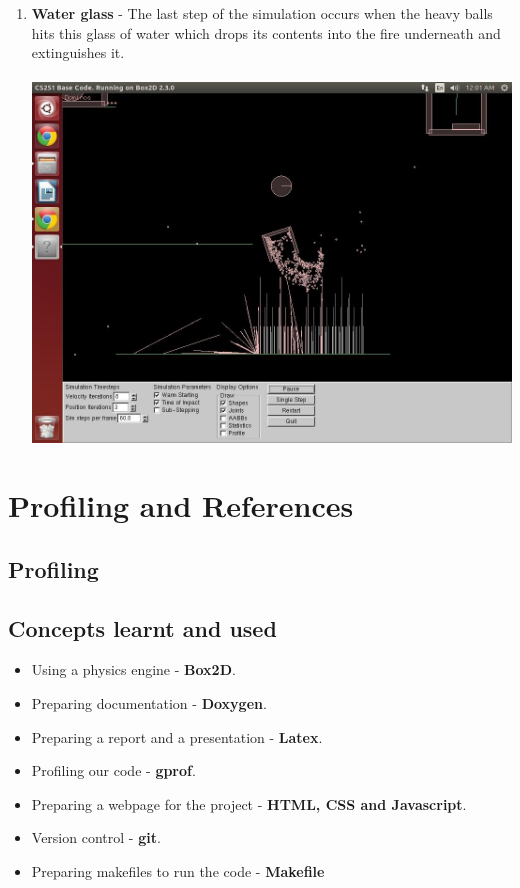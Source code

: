 \documentclass{report}
\begin{document}
\begin{enumerate}
\item \textbf{Water glass} - The last step of the simulation occurs when the heavy balls hits this glass of water which drops its contents into the fire underneath and extinguishes it.\\\\
\includegraphics[scale=0.25]{pics/WaterGlassAndFire(extinguished)}

\end{enumerate}
\pagebreak

\chapter{Profiling and References}
\section{Profiling}


\section{Concepts learnt and used}
\begin{itemize}
\item Using a physics engine - \textbf{Box2D}.
\item Preparing documentation - \textbf{Doxygen}.
\item Preparing a report and a presentation - \textbf{Latex}.
\item Profiling our code - \textbf{gprof}.
\item Preparing a webpage for the project - \textbf{HTML, CSS and Javascript}.
\item Version control - \textbf{git}.
\item Preparing makefiles to run the code - \textbf{Makefile}
\end{itemize}
\end{document}
